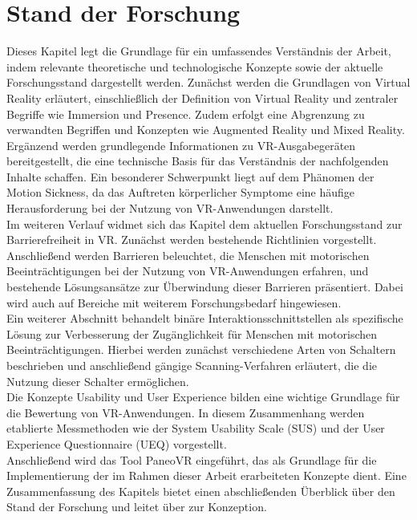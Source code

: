 \chapter{Stand der Forschung}
\label{chap:2Stand}

Dieses Kapitel legt die Grundlage für ein umfassendes Verständnis der Arbeit, indem relevante theoretische und technologische Konzepte sowie der aktuelle Forschungsstand dargestellt werden. Zunächst werden die Grundlagen von Virtual Reality erläutert, einschließlich der Definition von Virtual Reality und zentraler Begriffe wie Immersion und Presence. Zudem erfolgt eine Abgrenzung zu verwandten Begriffen und Konzepten wie Augmented Reality und Mixed Reality. Ergänzend werden grundlegende Informationen zu VR-Ausgabegeräten bereitgestellt, die eine technische Basis für das Verständnis der nachfolgenden Inhalte schaffen. Ein besonderer Schwerpunkt liegt auf dem Phänomen der Motion Sickness, da das Auftreten körperlicher Symptome eine häufige Herausforderung bei der Nutzung von VR-Anwendungen darstellt. \\
Im weiteren Verlauf widmet sich das Kapitel dem aktuellen Forschungsstand zur Barrierefreiheit in VR. Zunächst werden bestehende Richtlinien vorgestellt. Anschließend werden Barrieren beleuchtet, die Menschen mit motorischen Beeinträchtigungen bei der Nutzung von VR-Anwendungen erfahren, und bestehende Lösungsansätze zur Überwindung dieser Barrieren präsentiert. Dabei wird auch auf Bereiche mit weiterem Forschungsbedarf hingewiesen.\\
Ein weiterer Abschnitt behandelt binäre Interaktionsschnittstellen als spezifische Lösung zur Verbesserung der Zugänglichkeit für Menschen mit motorischen Beeinträchtigungen. Hierbei werden zunächst verschiedene Arten von Schaltern beschrieben und anschließend gängige Scanning-Verfahren erläutert, die die Nutzung dieser Schalter ermöglichen.\\
Die Konzepte Usability und User Experience bilden eine wichtige Grundlage für die Bewertung von VR-Anwendungen. In diesem Zusammenhang werden etablierte Messmethoden wie der System Usability Scale (SUS) und der User Experience Questionnaire (UEQ) vorgestellt.\\
Anschließend wird das Tool PaneoVR eingeführt, das als Grundlage für die Implementierung der im Rahmen dieser Arbeit erarbeiteten Konzepte dient. Eine Zusammenfassung des Kapitels bietet einen abschließenden Überblick über den Stand der Forschung und leitet über zur Konzeption.

